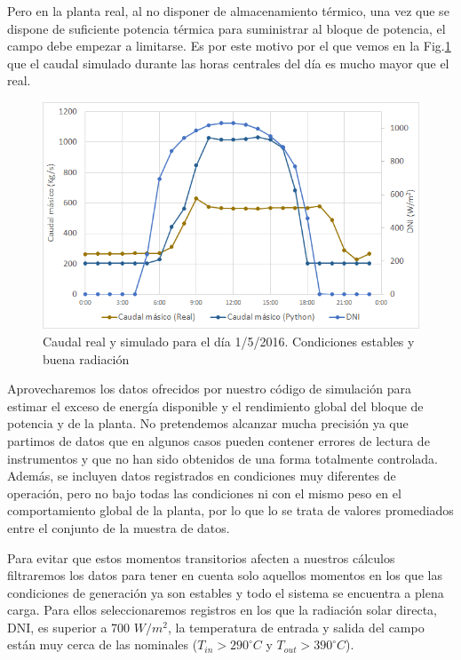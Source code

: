 Pero en la planta real, al no disponer de almacenamiento térmico, una vez que se dispone de suficiente potencia térmica para suministrar al bloque de potencia, el campo debe empezar a limitarse. Es por este motivo por el que vemos en la Fig.\ref{fig:caudal_1b} que el caudal simulado durante las  horas centrales del día es mucho mayor que el real. 

\begin{figure}[H]
\includegraphics[width=0.9\linewidth]{images/caudal_aste1b_01052016.png}
\caption[Caudal real y simulado en un día de condiciones estables]{Caudal real y simulado para el día 1/5/2016. Condiciones estables y buena radiación} 
\label{fig:caudal_1b}
\end{figure}

Aprovecharemos los datos ofrecidos por nuestro código de simulación para estimar el exceso de energía disponible y el rendimiento global del bloque de potencia y de la planta. No pretendemos alcanzar mucha precisión ya que partimos de datos que en algunos casos pueden contener errores de lectura de instrumentos y que no han sido obtenidos de una forma totalmente controlada. Además, se incluyen datos registrados en condiciones muy diferentes de operación, pero no bajo todas las condiciones ni con el mismo peso en el comportamiento global de la planta, por lo que lo se trata de valores promediados entre el conjunto de la muestra de datos.

Para evitar que estos momentos transitorios afecten a nuestros cálculos filtraremos los datos para tener en cuenta solo aquellos momentos en los que las condiciones de generación ya son estables y todo el sistema se encuentra a plena carga. Para ellos seleccionaremos registros en los que la radiación solar directa, DNI, es superior a 700 $W/m^2$, la temperatura de entrada y salida del campo están muy cerca de las nominales ($T_{in}>290 ^\circ C$  y $T_{out}>390 ^\circ C$). 

